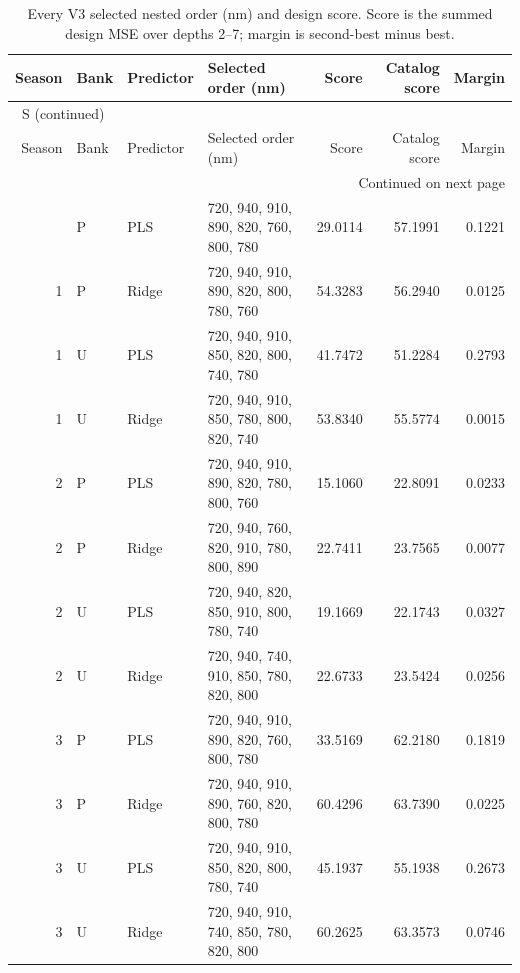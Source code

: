 \documentclass[10pt,a4paper]{article}
\renewcommand{\thetable}{S\arabic{table}}
\begin{document}
\clearpage
\begin{landscape}
\begingroup\footnotesize
\setlength{\tabcolsep}{3.5pt}
\renewcommand{\arraystretch}{1.10}
\begin{longtable}{rlllrrr}
\caption{Every V3 selected nested order (nm) and design score. Score is the summed design MSE over depths 2--7; margin is second-best minus best.}\label{tab:orders}\\
\toprule
Season & Bank & Predictor & Selected order (nm) & Score & Catalog score & Margin \\
\midrule
\endfirsthead
\multicolumn{7}{l}{\tablename~\thetable{} (continued)}\\
\toprule
Season & Bank & Predictor & Selected order (nm) & Score & Catalog score & Margin \\
\midrule
\endhead
\midrule
\multicolumn{7}{r}{Continued on next page}\\
\endfoot
\bottomrule
\endlastfoot
1 & P & PLS & 720, 940, 910, 890, 820, 760, 800, 780 & 29.0114 & 57.1991 & 0.1221 \\
1 & P & Ridge & 720, 940, 910, 890, 820, 800, 780, 760 & 54.3283 & 56.2940 & 0.0125 \\
1 & U & PLS & 720, 940, 910, 850, 820, 800, 740, 780 & 41.7472 & 51.2284 & 0.2793 \\
1 & U & Ridge & 720, 940, 910, 850, 780, 800, 820, 740 & 53.8340 & 55.5774 & 0.0015 \\
2 & P & PLS & 720, 940, 910, 890, 820, 780, 800, 760 & 15.1060 & 22.8091 & 0.0233 \\
2 & P & Ridge & 720, 940, 760, 820, 910, 780, 800, 890 & 22.7411 & 23.7565 & 0.0077 \\
2 & U & PLS & 720, 940, 820, 850, 910, 800, 780, 740 & 19.1669 & 22.1743 & 0.0327 \\
2 & U & Ridge & 720, 940, 740, 910, 850, 780, 820, 800 & 22.6733 & 23.5424 & 0.0256 \\
3 & P & PLS & 720, 940, 910, 890, 820, 760, 800, 780 & 33.5169 & 62.2180 & 0.1819 \\
3 & P & Ridge & 720, 940, 910, 890, 760, 820, 800, 780 & 60.4296 & 63.7390 & 0.0225 \\
3 & U & PLS & 720, 940, 910, 850, 820, 800, 780, 740 & 45.1937 & 55.1938 & 0.2673 \\
3 & U & Ridge & 720, 940, 910, 740, 850, 780, 820, 800 & 60.2625 & 63.3573 & 0.0746 \\
\end{longtable}
\endgroup
\end{landscape}
\end{document}
